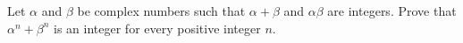 Let $\alpha$ and $\beta$ be complex numbers such that $\alpha+\beta$ and $\alpha\beta$ are integers. Prove that $\alpha^n+\beta^n$ is an integer for every positive integer $n$.
